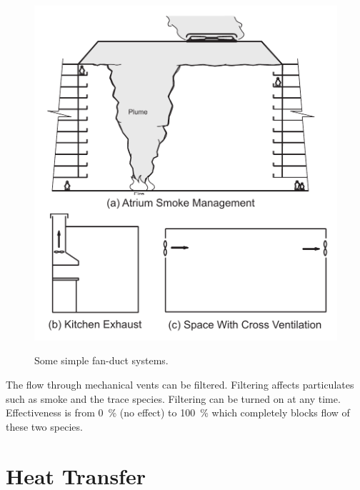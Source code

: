 \begin{figure}
\begin{center}
\includegraphics[width=5.0in]{FIGURES/Theory/HVAC_Fans_and_Ducts}\\
\end{center}
\caption{Some simple fan-duct systems.}
 \label{fig:Fans_and_Ducts}
\end{figure}

The flow through mechanical vents can be filtered. Filtering affects particulates such as smoke and the trace species. Filtering can be turned on at any time. Effectiveness is from 0~\% (no effect) to 100~\% which completely blocks flow of these two species.





\chapter{Heat Transfer}

